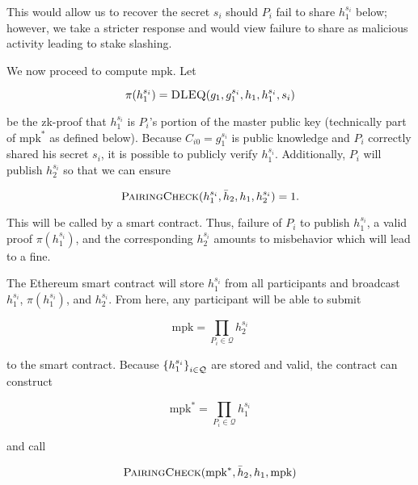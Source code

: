 \noindent
This would allow us to recover the secret $s_{i}$ should $P_{i}$
fail to share $h_{1}^{s_{i}}$ below; however,
we take a stricter response and would view failure to share
as malicious activity leading to stake slashing.

We now proceed to compute $\text{mpk}$.
Let

\begin{equation}
    \pi(h_{1}^{s_{i}}) = \textsc{DLEQ}(
        g_{1},g_{1}^{s_{i}},h_{1},h_{1}^{s_{i}},s_{i})
\end{equation}

\noindent
be the zk-proof that $h_{1}^{s_{i}}$ is $P_{i}$'s portion
of the master public key (technically part of $\text{mpk}^{*}$
as defined below).
Because $C_{i0} = g_{1}^{s_{i}}$ is public knowledge
and $P_{i}$ correctly shared his secret $s_{i}$, it is possible
to publicly verify $h_{1}^{s_{i}}$.
Additionally, $P_{i}$ will publish $h_{2}^{s_{i}}$ so that
we can ensure

\begin{equation}
    \textsc{PairingCheck}(h_{1}^{s_{i}},\bar{h}_{2},h_{1},h_{2}^{s_{i}})
        = 1.
\end{equation}

\noindent
This will be called by a smart contract.
Thus, failure of $P_{i}$ to publish $h_{1}^{s_{i}}$,
a valid proof $\pi(h_{1}^{s_{i}})$, and the corresponding
$h_{2}^{s_{i}}$ amounts to misbehavior which will
lead to a fine.

The Ethereum smart contract will store $h_{1}^{s_{i}}$ from
all participants and broadcast
$h_{1}^{s_{i}}$, $\pi(h_{1}^{s_{i}})$, and $h_{2}^{s_{i}}$.
From here, any participant will be able to submit

\begin{equation}
    \text{mpk} = \prod_{P_{i}\in\mathcal{Q}} h_{2}^{s_{i}}
\end{equation}

\noindent
to the smart contract.
Because $\left\{ h_{1}^{s_{i}} \right\}_{i\in\mathcal{Q}}$ are stored
and valid, the contract can construct

\begin{equation}
    \text{mpk}^{*} = \prod_{P_{i}\in\mathcal{Q}} h_{1}^{s_{i}}
    \label{eq:mpk_dual}
\end{equation}

\noindent
and call

\begin{equation}
    \textsc{PairingCheck}(\text{mpk}^{*},\bar{h}_{2},h_{1},\text{mpk})
\end{equation}


